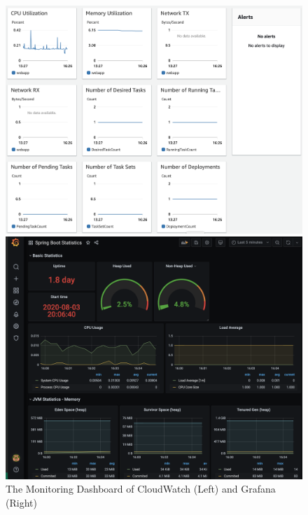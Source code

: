 \begin{figure}[!tbp]
     \centering
     \begin{minipage}[b]{0.47\textwidth}
       \includegraphics[width=\textwidth]{pics/monitoring.png}
     \end{minipage}
     \hfill
     \begin{minipage}[b]{0.50\textwidth}
       \includegraphics[width=\textwidth]{pics/grafana.png}
     \end{minipage}
     \caption{The Monitoring Dashboard of CloudWatch (Left) and Grafana (Right)}
     \label{fig:monitoring}
   \end{figure}
